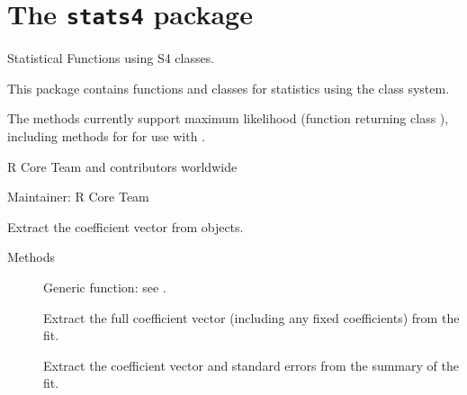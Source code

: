 
\chapter{The \texttt{stats4} package}
%
\begin{Description}\relax
Statistical Functions using S4 classes.
\end{Description}
%
\begin{Details}\relax
This package contains functions and classes for statistics
using the  class system.

The methods currently support maximum likelihood (function
 returning class ),
including methods for  for use
with .
\end{Details}
%
\begin{Author}\relax
R Core Team and contributors worldwide

Maintainer: R Core Team 
\end{Author}
%
\begin{Description}\relax
Extract the coefficient vector from  objects.
\end{Description}
%
\begin{Section}{Methods}
\begin{description}

\item[] Generic function: see
.
\item[] Extract the full coefficient
vector (including any fixed coefficients) from the fit.
\item[] Extract the
coefficient vector and standard errors from the summary of the
fit.

\end{description}

\end{Section}
